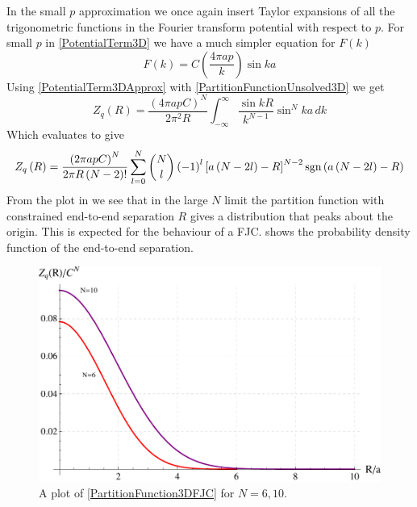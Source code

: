 In the small $p$ approximation we once again insert Taylor expansions of all the trigonometric functions in the Fourier transform potential with respect to $p$. For small $p$ in \eqref{PotentialTerm3D} we have a much simpler equation for $F\left(k\right)$
%
\begin{equation}
F\left(k\right)=C\left(\frac{4\pi a p}{k}\right)\sin ka\label{PotentialTerm3DApprox}
\end{equation}
%
Using \eqref{PotentialTerm3DApprox} with \eqref{PartitionFunctionUnsolved3D}
we get
%
\begin{equation}
Z_{q}\left(R\right)=\frac{\left(4\pi a p C\right)^{N}}{2\pi^{2}R}\int_{-\infty}^{\infty}\frac{\sin kR}{k^{N-1}}\sin^{N}ka\, dk
\end{equation}
%
Which evaluates to give
%
\begin{equation}
Z_{q}\left(R\right)=\frac{\left(2\pi a p C\right)^{N}}{2\pi R\left(N-2\right)!}\sum_{l=0}^{N}\binom{N}{l}\left(-1\right)^{l}\left[a\left(N-2l\right)-R\right]^{N-2}\text{sgn}\left(a\left(N-2l\right)-R\right)\label{PartitionFunction3DSmallp}
\end{equation}
%
From the plot in  we see that in the large $N$ limit the partition function with constrained end-to-end separation $R$ gives a distribution that peaks about the origin. This is expected for the behaviour of
a FJC.  shows the probability density function of the end-to-end separation. 
%
\begin{figure}[htp]
 \centering \includegraphics[scale=0.6]{Graphics/PartitionFunction3D.pdf} 
\caption{A plot of \eqref{PartitionFunction3DFJC} for $N=6,10$.}
\label{fig:PF3D} 
\end{figure}

